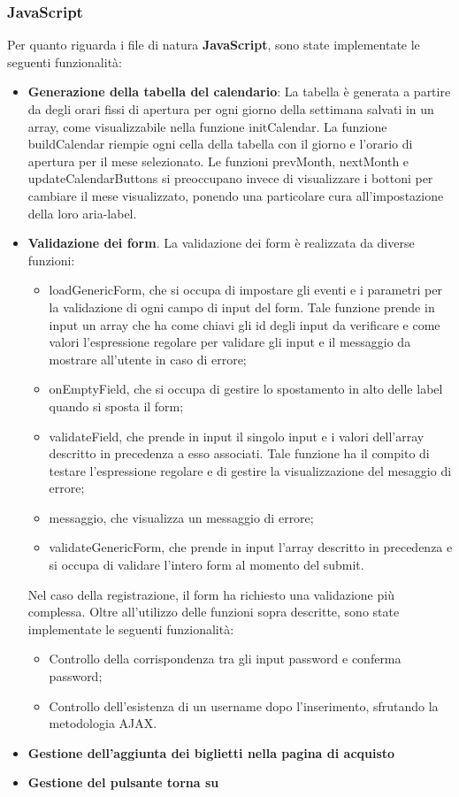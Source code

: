 \subsubsection{JavaScript}
Per quanto riguarda i file di natura \textbf{JavaScript}, sono state implementate le seguenti funzionalità:
\begin{itemize}
    \item \textbf{Generazione della tabella del calendario}:
        La tabella è generata a partire da degli orari fissi di apertura per ogni giorno della settimana salvati in un array, come visualizzabile nella funzione initCalendar. La funzione buildCalendar riempie ogni cella della tabella con il giorno e l'orario di apertura per il mese selezionato. Le funzioni prevMonth, nextMonth e updateCalendarButtons si preoccupano invece di visualizzare i bottoni per cambiare il mese visualizzato, ponendo una particolare cura all'impostazione della loro aria-label.
    \item \textbf{Validazione dei form}. La validazione dei form è realizzata da diverse funzioni:
    \begin{itemize}
        \item loadGenericForm, che si occupa di impostare gli eventi e i parametri per la validazione di ogni campo di input del form. Tale funzione prende in input un array che ha come chiavi gli id degli input da verificare e come valori l'espressione regolare per validare gli input e il messaggio da mostrare all'utente in caso di errore;
        \item onEmptyField, che si occupa di gestire lo spostamento in alto delle label quando si sposta il form;
        \item validateField, che prende in input il singolo input e i valori dell'array descritto in precedenza a esso associati. Tale funzione ha il compito di testare l'espressione regolare e di gestire la visualizzazione del mesaggio di errore;
        \item messaggio, che visualizza un messaggio di errore;
        \item validateGenericForm, che prende in input l'array descritto in precedenza e si 
        occupa di validare l'intero form al momento del submit.
    \end{itemize}
        Nel caso della registrazione, il form ha richiesto una validazione più complessa. Oltre all'utilizzo delle funzioni sopra descritte, sono state implementate le seguenti funzionalità:
        \begin{itemize}
            \item Controllo della corrispondenza tra gli input password e conferma password;
            \item Controllo dell'esistenza di un username dopo l'inserimento, sfrutando la metodologia AJAX.
        \end{itemize}
    
    \item \textbf{Gestione dell'aggiunta dei biglietti nella pagina di acquisto}
    \item \textbf{Gestione del pulsante torna su}
\end{itemize}

